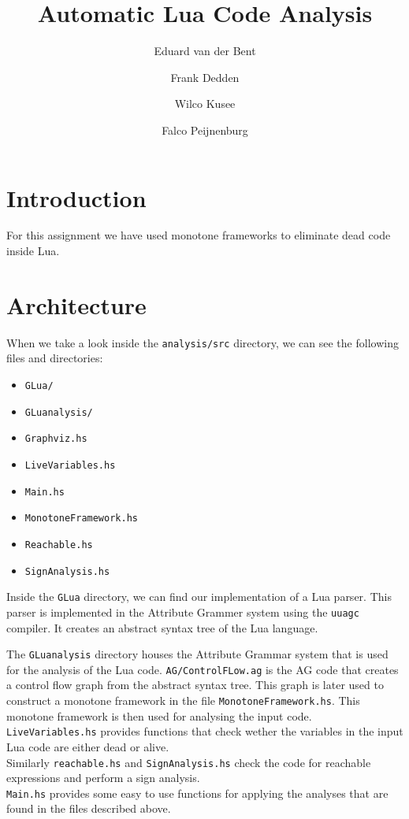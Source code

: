 \documentclass[10pt]{article}
\title{Automatic Lua Code Analysis}
\author{Eduard van der Bent \and Frank Dedden \and Wilco Kusee \and Falco Peijnenburg}
\begin{document}
\maketitle


\section{Introduction}

For this assignment we have used monotone frameworks to eliminate dead code inside Lua.

\section{Architecture} %
When we take a look inside the \texttt{analysis/src} directory, we can see the following files and directories:
\begin{itemize}
    \item \texttt{GLua/}
    \item \texttt{GLuanalysis/}
    \item \texttt{Graphviz.hs}
    \item \texttt{LiveVariables.hs}
    \item \texttt{Main.hs}
    \item \texttt{MonotoneFramework.hs}
    \item \texttt{Reachable.hs}
    \item \texttt{SignAnalysis.hs}
\end{itemize}

Inside the \texttt{GLua} directory, we can find our implementation of a Lua parser. This parser is implemented in the Attribute Grammer system using the \texttt{uuagc} compiler. It creates an abstract syntax tree of the Lua language. %

The \texttt{GLuanalysis} directory houses the Attribute Grammar system that is used for the analysis of the Lua code. \texttt{AG/ControlFLow.ag} is the AG code that creates a control flow graph from the abstract syntax tree. This graph is later used to construct a monotone framework in the file \texttt{MonotoneFramework.hs}. This monotone framework is then used for analysing the input code.\\
\texttt{LiveVariables.hs} provides functions that check wether the variables in the input Lua code are either dead or alive.\\
Similarly \texttt{reachable.hs} and \texttt{SignAnalysis.hs} check the code for reachable expressions and perform a sign analysis.\\
\texttt{Main.hs} provides some easy to use functions for applying the analyses that are found in the files described above.
\end{document}
